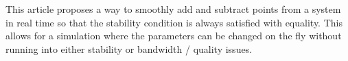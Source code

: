 \documentclass[reprint]{JASA}
\begin{document}
This article proposes a way to smoothly add and subtract points from a system in real time so that the stability condition is always satisfied with equality. This allows for a simulation where the parameters can be changed on the fly without running into either stability or bandwidth / quality issues. 










 

\end{document}
